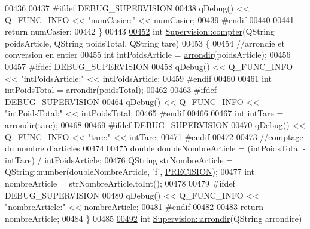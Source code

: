 \begin{DoxyCode}
{{{00436 
00437 \textcolor{preprocessor}{    #ifdef DEBUG\_SUPERVISION}
00438         qDebug() << Q\_FUNC\_INFO << \textcolor{stringliteral}{"numCasier:"} << numCasier;
00439 \textcolor{preprocessor}{    #endif}
00440 
00441     \textcolor{keywordflow}{return} numCasier;
00442 \}
00443 
\hyperlink{class_supervision_a81b1b8960cb2857be4a6789cf27cd413}{00452} \textcolor{keywordtype}{int} \hyperlink{class_supervision_a81b1b8960cb2857be4a6789cf27cd413}{Supervision::compter}(QString poidsArticle, QString poidsTotal, QString tare)
00453 \{
00454     \textcolor{comment}{//arrondie et conversion en entier}
00455     \textcolor{keywordtype}{int} intPoidsArticle = \hyperlink{class_supervision_a16fde33340a8bc8b0936926cd6dc0657}{arrondir}(poidsArticle);
00456 
00457 \textcolor{preprocessor}{    #ifdef DEBUG\_SUPERVISION}
00458         qDebug() << Q\_FUNC\_INFO << \textcolor{stringliteral}{"intPoidsArticle:"} << intPoidsArticle;
00459 \textcolor{preprocessor}{    #endif}
00460 
00461     \textcolor{keywordtype}{int} intPoidsTotal = \hyperlink{class_supervision_a16fde33340a8bc8b0936926cd6dc0657}{arrondir}(poidsTotal);
00462 
00463 \textcolor{preprocessor}{    #ifdef DEBUG\_SUPERVISION}
00464         qDebug() << Q\_FUNC\_INFO << \textcolor{stringliteral}{"intPoidsTotal:"} << intPoidsTotal;
00465 \textcolor{preprocessor}{    #endif}
00466 
00467     \textcolor{keywordtype}{int} intTare = \hyperlink{class_supervision_a16fde33340a8bc8b0936926cd6dc0657}{arrondir}(tare);
00468 
00469 \textcolor{preprocessor}{    #ifdef DEBUG\_SUPERVISION}
00470         qDebug() << Q\_FUNC\_INFO << \textcolor{stringliteral}{"tare:"} << intTare;
00471 \textcolor{preprocessor}{    #endif}
00472 
00473     \textcolor{comment}{//comptage du nombre d'articles}
00474 
00475     \textcolor{keywordtype}{double} doubleNombreArticle = (intPoidsTotal - intTare) / intPoidsArticle;
00476     QString strNombreArticle = QString::number(doubleNombreArticle, \textcolor{charliteral}{'f'}, 
      \hyperlink{_supervision_8h_a9c7b069fee3c8184e14a7de8e5da2dc6}{PRECISION});
00477     \textcolor{keywordtype}{int} nombreArticle = strNombreArticle.toInt();
00478 
00479 \textcolor{preprocessor}{    #ifdef DEBUG\_SUPERVISION}
00480         qDebug() << Q\_FUNC\_INFO << \textcolor{stringliteral}{"nombreArticle:"} << nombreArticle;
00481 \textcolor{preprocessor}{    #endif}
00482 
00483     \textcolor{keywordflow}{return} nombreArticle;
00484 \}
00485 
\hyperlink{class_supervision_a16fde33340a8bc8b0936926cd6dc0657}{00492} \textcolor{keywordtype}{int} \hyperlink{class_supervision_a16fde33340a8bc8b0936926cd6dc0657}{Supervision::arrondir}(QString arrondire)
}}}
\end{DoxyCode}
